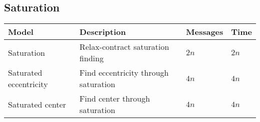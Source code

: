\subsection{Saturation}
\begin{table}[h]
\begin{tabular}{llll}
			\textbf{Model}			& \textbf{Description}						& \textbf{Messages}						& \textbf{Time} \\
	\hline 	Saturation				& Relax-contract saturation finding			& $2n$					 				& $2n$ \\
	\hline 	Saturated eccentricity	& Find eccentricity through saturation		& $4n$									& $4n$ \\
	\hline 	Saturated center		& Find center through saturation			& $4n$									& $4n$ \\
\end{tabular}
\end{table}